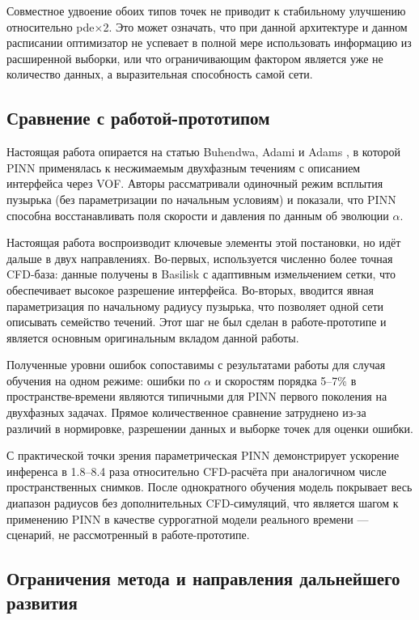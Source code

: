 \documentclass[12pt,a4paper]{article}
\begin{document}
Совместное удвоение обоих типов точек не приводит к стабильному улучшению
относительно pde$\times$2. Это может означать, что при данной архитектуре и
данном расписании оптимизатор не успевает в полной мере использовать
информацию из расширенной выборки, или что ограничивающим фактором является
уже не количество данных, а выразительная способность самой сети.

\subsection{Сравнение с работой-прототипом}

Настоящая работа опирается на статью Buhendwa, Adami и Adams
\cite{Buhendwa2021}, в которой PINN применялась к несжимаемым двухфазным
течениям с описанием интерфейса через VOF. Авторы рассматривали одиночный
режим всплытия пузырька (без параметризации по начальным условиям) и показали,
что PINN способна восстанавливать поля скорости и давления по данным об
эволюции \(\alpha\).

Настоящая работа воспроизводит ключевые элементы этой постановки, но идёт
дальше в двух направлениях. Во-первых, используется численно более точная
CFD-база: данные получены в Basilisk с адаптивным измельчением сетки, что
обеспечивает высокое разрешение интерфейса. Во-вторых, вводится явная
параметризация по начальному радиусу пузырька, что позволяет одной сети
описывать семейство течений. Этот шаг не был сделан в работе-прототипе и
является основным оригинальным вкладом данной работы.

Полученные уровни ошибок сопоставимы с результатами работы \cite{Buhendwa2021}
для случая обучения на одном режиме: ошибки по \(\alpha\) и скоростям порядка
5--7\% в пространстве-времени являются типичными для PINN первого поколения на
двухфазных задачах. Прямое количественное сравнение затруднено из-за различий
в нормировке, разрешении данных и выборке точек для оценки ошибки.

С практической точки зрения параметрическая PINN демонстрирует ускорение
инференса в 1.8--8.4 раза относительно CFD-расчёта при аналогичном числе
пространственных снимков. После однократного обучения модель покрывает весь
диапазон радиусов без дополнительных CFD-симуляций, что является шагом к
применению PINN в качестве суррогатной модели реального времени --- сценарий,
не рассмотренный в работе-прототипе.

\subsection{Ограничения метода и направления дальнейшего развития}
\end{document}
